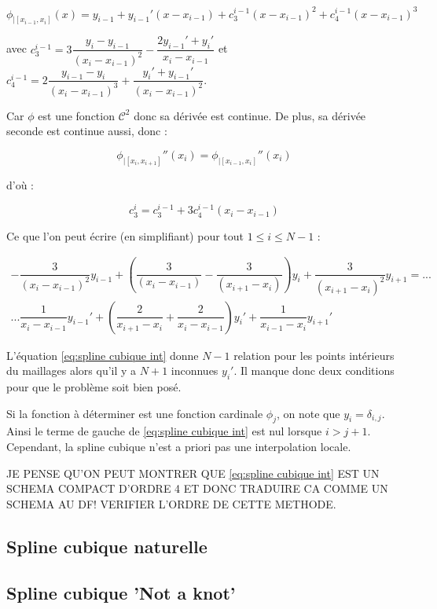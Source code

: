 \begin{equation}
\phi_{|[x_{i-1}, x_{i}]} (x) = y_{i-1} + y_{i-1}' (x-x_{i-1}) + c_3^{i-1} (x-x_{i-1})^2 + c_4^{i-1} (x-x_{i-1})^3
\end{equation}

avec $c_3^{i-1} = 3 \dfrac{y_i - y_{i-1}}{(x_{i}-x_{i-1})^2} - \dfrac{2 y_{i-1}' + y_{i}'}{x_{i}-x_{i-1}}$ et 
$c_4^{i-1} = 2 \dfrac{y_{i-1} - y_i}{(x_{i}-x_{i-1})^3} + \dfrac{y_{i}' + y_{i-1}'}{(x_{i}-x_{i-1})^2}$.

Car $\phi$ est une fonction $\mathcal{C}^2$ donc sa dérivée est continue. De plus, sa dérivée seconde est continue aussi, donc :

\begin{equation}
\phi_{|[x_i, x_{i+1}]}''(x_i) = \phi_{|[x_{i-1}, x_{i}]}''(x_i) 
\end{equation}

d'où :

\begin{equation}
c_3^i = c_3^{i-1} + 3 c_4^{i-1} ( x_i - x_{i-1} )
\end{equation}

Ce que l'on peut écrire (en simplifiant) pour tout $1 \leq i \leq N-1$ :

\begin{multline}
- \dfrac{3}{(x_i - x_{i-1})^2} y_{i-1} + \left( \dfrac{3}{(x_i - x_{i-1})} - \dfrac{3}{(x_{i+1} - x_{i})} \right) y_i + \dfrac{3}{(x_{i+1} - x_{i})^2} y_{i+1} = ...\\
... \dfrac{1}{x_i - x_{i-1}} y_{i-1}' + \left( \dfrac{2}{x_{i+1}-x_i} + \dfrac{2}{x_{i}-x_{i-1}} \right)y_i' + \dfrac{1}{x_{i-1} - x_{i}} y_{i+1}' 
\label{eq:spline cubique int}
\end{multline}

L'équation \eqref{eq:spline cubique int} donne $N-1$ relation pour les points intérieurs du maillages alors qu'il y a $N+1$ inconnues $y_i'$. Il manque donc deux conditions pour que le problème soit bien posé.

Si la fonction à déterminer est une fonction cardinale $\phi_j$, on note que $y_i = \delta_{i,j}$. Ainsi le terme de gauche de \eqref{eq:spline cubique int} est nul lorsque $i>j+1$. Cependant, la spline cubique n'est a priori pas une interpolation locale.

JE PENSE QU'ON PEUT MONTRER QUE \eqref{eq:spline cubique int} EST UN SCHEMA COMPACT D'ORDRE 4 ET DONC TRADUIRE CA COMME UN SCHEMA AU DF! VERIFIER L'ORDRE DE CETTE METHODE.

\subsection{Spline cubique naturelle}

\subsection{Spline cubique 'Not a knot'}













